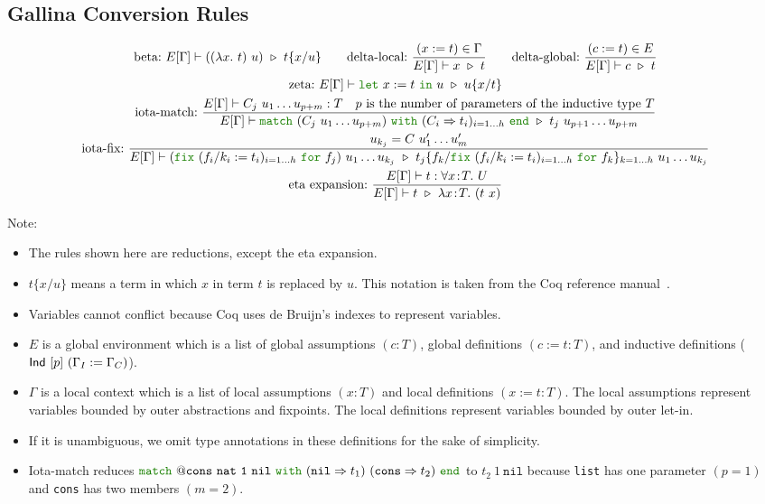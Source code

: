 \documentclass[a4paper,fleqn]{article}
\def\coq{\textrm{Coq}}
\def\gallina{\textrm{Gallina}}
\newcommand{\kwlet}{\mbox{\color{mygreen}\ttfamily let}}
\newcommand{\kwin}{\mbox{\color{mygreen}\ttfamily in}}
\newcommand{\kwmatch}{\mbox{\color{mygreen}\ttfamily match}}
\newcommand{\kwwith}{\mbox{\color{mygreen}\ttfamily with}}
\newcommand{\kwend}{\mbox{\color{mygreen}\ttfamily end}}
\newcommand{\kwfix}{\mbox{\color{mygreen}\ttfamily fix}}
\newcommand{\kwfor}{\mbox{\color{mygreen}\ttfamily for}}
\newcommand{\lam}[2]{\lambda #1.~#2}
\newcommand{\lamT}[3]{\lambda #1\!:\!#2.~#3}
\newcommand{\gassum}[2]{(#1\!:\!#2)}
\newcommand{\glodef}[3]{(#1:=#2\!:\!#3)}
\newcommand{\lassum}[2]{(#1\!:\!#2)}
\newcommand{\ldef}[3]{(#1:=#2\!:\!#3)}
\newcommand{\prodT}[3]{\forall #1\!:\!#2.~#3}
\newcommand{\letin}[3]{\kwlet~#1:=#2~\kwin~#3}
\newcommand{\match}[4]{\kwmatch~#1~\kwwith~(#2 \Rightarrow #3)_{#4}~\kwend}
\newcommand{\fix}[4]{\kwfix~(#1 := #2)_{#3}~\kwfor~#4}
\newcommand{\WT}[4]{\ensuremath{#1[#2] \vdash #3 : #4}}
\newcommand{\WTE}[3]{\WT{E}{#1}{#2}{#3}}
\newcommand{\WTEG}[2]{\WTE{\Gamma}{#1}{#2}}
\newcommand{\subst}[3]{#1\{#2/#3\}}
\begin{document}
\subsection{\gallina{} Conversion Rules}\label{sec:conversion-rules}

\begin{gather*}
  \text{beta:}~
    E[\Gamma] \vdash ((\lam{x}{t})~u)~\triangleright~\subst{t}{x}{u} \qquad
  \text{delta-local:}~
    \dfrac{(x:=t) \in \Gamma}{E[\Gamma] \vdash x~\triangleright~t} \qquad
  \text{delta-global:}~
    \dfrac{(c:=t) \in E}{E[\Gamma] \vdash c~\triangleright~t} \\
  \text{zeta:}~
    E[\Gamma] \vdash \letin{x}{t}{u}~\triangleright~\subst{u}{x}{t} \\
  \text{iota-match:}~
    \dfrac
    {
      E[\Gamma] \vdash C_j~u_1\ldots u_{p+m} : T \quad
      \text{$p$ is the number of parameters of the inductive type $T$}
    }{
      E[\Gamma] \vdash
      \match{(C_j~u_1\ldots u_{p+m})}{C_i}{t_i}{i=1\dots h}
      ~\triangleright~
      t_j~u_{p+1}\ldots u_{p+m}
    } \\
  \text{iota-fix:}~
    \dfrac{
      u_{k_j} = C~u'_1\ldots u'_m
    }{
      E[\Gamma] \vdash
      (\fix{f_i/k_i}{t_i}{i=1\dots h}{f_j})~u_1 \dots u_{k_j}
      ~\triangleright~
      \subst{t_j}{f_k}{\fix{f_i/k_i}{t_i}{i=1\dots h}{f_k}}_{k=1\dots h} ~u_1 \dots u_{k_j}} \\
  \text{eta expansion:}~
    \dfrac{\WTEG{t}{\prodT{x}{T}{U}}}{E[\Gamma] \vdash t~\triangleright~\lamT{x}{T}{(t~x)}}
\end{gather*}
\raggedright
{\small Note:
\begin{itemize}
  \item The rules shown here are reductions, except the eta expansion.
  \item $\subst{t}{x}{u}$ means a term in which $x$ in term $t$ is replaced by $u$.
    This notation is taken from the Coq reference manual~\cite{coqrefman8.12.0}.
  \item Variables cannot conflict because \coq{} uses de Bruijn's indexes to represent variables.
  \item $E$ is a global environment which is a list of
    global assumptions $\gassum{c}{T}$,
    global definitions $\glodef{c}{t}{T}$, and
    inductive definitions ($\text{\sf Ind}~[p]~(\Gamma_I := \Gamma_C)$).
  \item $\Gamma$ is a local context which is a list of
    local assumptions $\lassum{x}{T}$ and
    local definitions $\ldef{x}{t}{T}$.
    The local assumptions represent variables bounded by outer abstractions and fixpoints.
    The local definitions represent variables bounded by outer let-in.
  \item If it is unambiguous, we omit type annotations in these definitions for the sake of simplicity.
  \item Iota-match reduces $\kwmatch~\mathtt{@cons~nat~1~nil}~\kwwith~(\mathtt{nil} \Rightarrow t_1)~(\mathtt{cons} \Rightarrow t_2)~\kwend$ to $t_2~1~\mathtt{nil}$
    because \lstinline!list! has one parameter $(p=1)$ and \lstinline!cons! has two members $(m=2)$.
\end{itemize}}
\end{document}

